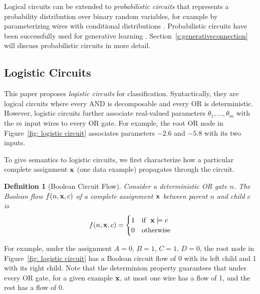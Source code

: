 \documentclass[letterpaper]{article} %
\newtheorem{definition}{Definition}
\begin{document}
Logical circuits can be extended to \textit{probabilistic circuits} that represents a probability distribution over binary random variables, for example by parameterizing wires with conditional distributions \cite{KisaVCD14}.
Probabilistic circuits have been successfully used for generative learning \cite{Liang2017}. Section~\ref{s:generativeconnection} will discuss probabilistic circuits in more detail.

\subsection{Logistic Circuits}
\label{s: logistic circuits}
This paper proposes \emph{logistic circuits} for classification. Syntactically, they are logical circuits where every AND is decomposable and every OR is deterministic.
However, logistic circuits further associate real-valued parameters $\theta_1, \dots, \theta_m$ with the $m$ input wires to every OR gate. For example, the root OR node in Figure~\ref{fig: logistic circuit} associates parameters $-2.6$ and $-5.8$ with its two inputs.

To give semantics to logistic circuits, we first characterize how a particular complete assignment $\bf x$ (one data example) propagates through the circuit.

\begin{definition}[Boolean Circuit Flow]
\label{definition: circuit flow}
Consider a deterministic OR gate $n$.
The Boolean flow $f(n,{\bf x},c)$ of a complete assignment $\bf x$ between parent $n$ and child $c$ is
\begin{align*}
f(n,{\bf x},c) = \begin{cases}
1 &\mbox{if~~} {\bf x} \models c \\
0 & \mbox{otherwise}
\end{cases}
\end{align*}
\end{definition}
For example, under the assignment $A=0$, $B=1$, $C=1$, $D=0$, the root node in Figure~\ref{fig: logistic circuit} has a Boolean circuit flow of 0 with its left child and 1 with its right child.
Note that the determinism property guarantees that under every OR gate, for a given example ${\bf x}$, at most one wire has a flow of 1, and the rest has a flow of $0$.
\end{document}
